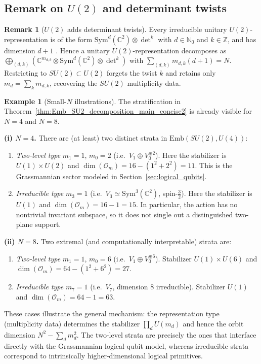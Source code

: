 \documentclass{article}%
\theoremstyle{definition}
\newtheorem{remark}[theorem]{Remark}
\newtheorem{example}[theorem]{Example}
\numberwithin{equation}{section}
\newcommand{\N}{\mathbb{N}}
\newcommand{\Z}{\mathbb{Z}}
\newcommand{\C}{\mathbb{C}}
\newcommand{\Emb}{\mathrm{Emb}}
\newcommand{\Sym}{\mathrm{Sym}}
\begin{document}
\subsection{Remark on $U(2)$ and determinant twists}
\label{subsec:Emb_U2_det_twists_concise}

\begin{remark}[$U(2)$ adds determinant twists]\label{rem:SU2_vs_U2_det_twists_concise2}
Every irreducible unitary $U(2)$-representation is of the form $\Sym^{d}(\C^2)\otimes \det^{k}$ with $d\in\N_0$ and $k\in\Z$, and has
dimension $d+1$ \cite{BrockerDieck1985,Hall2015,Knapp2002}. Hence a unitary $U(2)$-representation decomposes as
$\bigoplus_{(d,k)}(\C^{m_{d,k}}\otimes \Sym^{d}(\C^2)\otimes \det^{k})$ with $\sum_{(d,k)}m_{d,k}(d+1)=N$.
Restricting to $SU(2)\subset U(2)$ forgets the twist $k$ and retains only $m_d=\sum_k m_{d,k}$, recovering the $SU(2)$ multiplicity data.
\end{remark}

\begin{example}[Small-$N$ illustrations]\label{ex:smallN_strata_concise}
The stratification in Theorem~\ref{thm:Emb_SU2_decomposition_main_concise2} is already visible for $N=4$ and $N=8$.

\smallskip
\noindent\textbf{(i) $N=4$.}
There are (at least) two distinct strata in $\Emb(SU(2),U(4))$:
\begin{enumerate}
\item \emph{Two-level type} $m_1=1$, $m_0=2$ (i.e.\ $V_1\oplus V_0^{\oplus 2}$). Here the stabilizer is
$U(1)\times U(2)$ and $\dim(\mathcal O_m)=16-(1^2+2^2)=11$. This is the Grassmannian sector modeled in
Section~\ref{sec:logical_qubits}.
\item \emph{Irreducible type} $m_3=1$ (i.e.\ $V_3\simeq \Sym^3(\C^2)$, spin-$\tfrac32$). Here the stabilizer is $U(1)$ and
$\dim(\mathcal O_m)=16-1=15$. In particular, the action has no nontrivial invariant subspace, so it does not single out a
distinguished two-plane support.
\end{enumerate}

\smallskip
\noindent\textbf{(ii) $N=8$.}
Two extremal (and computationally interpretable) strata are:
\begin{enumerate}
\item \emph{Two-level type} $m_1=1$, $m_0=6$ (i.e.\ $V_1\oplus V_0^{\oplus 6}$). Stabilizer $U(1)\times U(6)$ and
$\dim(\mathcal O_m)=64-(1^2+6^2)=27$.
\item \emph{Irreducible type} $m_7=1$ (i.e.\ $V_7$, dimension $8$ irreducible). Stabilizer $U(1)$ and
$\dim(\mathcal O_m)=64-1=63$.
\end{enumerate}

\smallskip
\noindent
These cases illustrate the general mechanism: the representation type (multiplicity data) determines the stabilizer
$\prod_d U(m_d)$ and hence the orbit dimension $N^2-\sum_d m_d^2$. The two-level strata are precisely the ones that interface
directly with the Grassmannian logical-qubit model, whereas irreducible strata correspond to intrinsically higher-dimensional logical
primitives.
\end{example}
\end{document}
